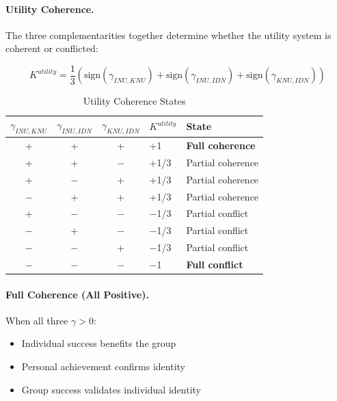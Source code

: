 \paragraph{Utility Coherence.}
The three complementarities together determine whether the utility system 
is coherent or conflicted:

\begin{definition}
\label{def:utility-coherence}
\begin{equation}
K^{utility} = \frac{1}{3} \left( \text{sign}(\gamma_{INU,KNU}) + \text{sign}(\gamma_{INU,IDN}) + \text{sign}(\gamma_{KNU,IDN}) \right)
\end{equation}
\end{definition}

\begin{table}[htbp]
\centering
\caption{Utility Coherence States}
\label{tab:utility-coherence-states}
\renewcommand{\arraystretch}{1.3}
\begin{tabular}{@{}cccll@{}}
\toprule
$\gamma_{INU,KNU}$ & $\gamma_{INU,IDN}$ & $\gamma_{KNU,IDN}$ & $K^{utility}$ & \textbf{State} \\
\midrule
+ & + & + & +1 & \textbf{Full coherence} \\
+ & + & $-$ & +1/3 & Partial coherence \\
+ & $-$ & + & +1/3 & Partial coherence \\
$-$ & + & + & +1/3 & Partial coherence \\
+ & $-$ & $-$ & $-$1/3 & Partial conflict \\
$-$ & + & $-$ & $-$1/3 & Partial conflict \\
$-$ & $-$ & + & $-$1/3 & Partial conflict \\
$-$ & $-$ & $-$ & $-$1 & \textbf{Full conflict} \\
\bottomrule
\end{tabular}
\end{table}

\paragraph{Full Coherence (All Positive).}
When all three $\gamma > 0$:
\begin{itemize}
\item Individual success benefits the group
\item Personal achievement confirms identity
\item Group success validates individual identity
\end{itemize}

